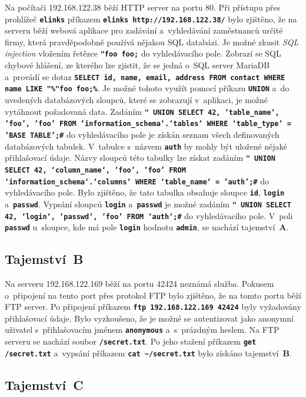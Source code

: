 \documentclass[a4paper, 10pt, twocolumn]{article}
\renewcommand{\tt}[1]{\texttt{\textbf{#1}}}
\begin{document}
	Na počítači 192.168.122.38 běží HTTP server na portu 80. Při
	přístupu přes prohlížeč \tt{elinks} příkazem \tt{elinks
	http://192.168.122.38/} bylo zjištěno, že na serveru běží
	webová aplikace pro zadávání a~vyhledávání zaměstnanců určité
	firmy, která pravděpodobně používá nějakou SQL databázi. Je
	možné zkusit  \textit{SQL injection} vložením řetězce
	\tt{"foo foo;} do vyhledávacího pole. Zobrazí se SQL chybové
	hlášení, ze kterého lze zjistit, že se jedná o~SQL server
	MariaDB a~provádí se dotaz \tt{SELECT id, name, email, address
	FROM contact WHERE name LIKE "\%"foo foo;\%}. Je možné tohoto
	využít pomocí příkazu \tt{UNION} a~do uvedených databázových
	sloupců, které se zobrazují v~aplikaci, je možné vytáhnout
	požadovaná data. Zadáním \tt{" UNION SELECT 42, `table\_name`,
	'foo', 'foo' FROM `information\_schema`.`tables` WHERE
	`table\_type` = 'BASE TABLE';\#} do vyhledávacího pole je
	získán seznam všech definovaných databázových tabulek.
	V~tabulce s~názvem \tt{auth} by mohly být uložené nějaké
	přihlašovací údaje. Názvy sloupců této tabulky lze získat
	zadáním \tt{" UNION SELECT 42, `column\_name`, 'foo',
	'foo' FROM `information\_schema`.`columns` WHERE `table\_name`
	= 'auth';\#} do vyhledávacího pole. Bylo zjištěno, že tato
	tabulka obsahuje sloupce \tt{id}, \tt{login} a~\tt{passwd}.
	Vypsání sloupců \tt{login} a~\tt{passwd} je možné zadáním
	\tt{" UNION SELECT 42, `login`, `passwd`, 'foo' FROM
	`auth`;\#} do vyhledávacího pole. V~poli \tt{passwd} u~sloupce,
	kde má pole \tt{login} hodnotu \tt{admin}, se nachází
	tajemství~\textbf{A}.

	\subsection{Tajemství~B}

	Na serveru 192.168.122.169 běží na portu 42424 neznámá služba.
	Pokusem o~připojení na tento port přes protokol FTP bylo zjištěno,
	že na tomto portu běží FTP server. Po připojení příkazem
	\tt{ftp 192.168.122.169 42424} byly vyžadovány přihlašovací
	údaje. Bylo vyzkoušeno, že je možné se autentizovat jako
	anonymní uživatel s~přihlašovacím jménem \tt{anonymous}
	a~s~prázdným heslem. Na FTP serveru se nachází soubor
	\tt{/secret.txt}. Po jeho stažení příkazem \tt{get /secret.txt}
	a~vypsání příkazem \tt{cat \textasciitilde/secret.txt} bylo
	získáno tajemství~\textbf{B}.

	\subsection{Tajemství~C}
\end{document}
